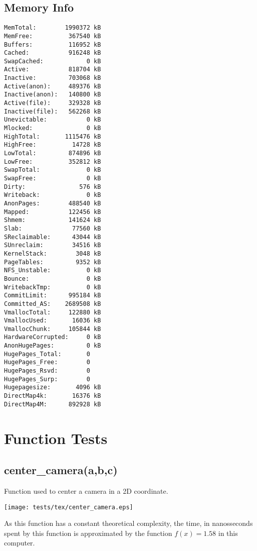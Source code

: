 \documentclass{article}
\begin{document}
\subsection{Memory Info}
\begin{verbatim}
MemTotal:        1990372 kB
MemFree:          367540 kB
Buffers:          116952 kB
Cached:           916248 kB
SwapCached:            0 kB
Active:           818704 kB
Inactive:         703068 kB
Active(anon):     489376 kB
Inactive(anon):   140800 kB
Active(file):     329328 kB
Inactive(file):   562268 kB
Unevictable:           0 kB
Mlocked:               0 kB
HighTotal:       1115476 kB
HighFree:          14728 kB
LowTotal:         874896 kB
LowFree:          352812 kB
SwapTotal:             0 kB
SwapFree:              0 kB
Dirty:               576 kB
Writeback:             0 kB
AnonPages:        488540 kB
Mapped:           122456 kB
Shmem:            141624 kB
Slab:              77560 kB
SReclaimable:      43044 kB
SUnreclaim:        34516 kB
KernelStack:        3048 kB
PageTables:         9352 kB
NFS_Unstable:          0 kB
Bounce:                0 kB
WritebackTmp:          0 kB
CommitLimit:      995184 kB
Committed_AS:    2689508 kB
VmallocTotal:     122880 kB
VmallocUsed:       16036 kB
VmallocChunk:     105844 kB
HardwareCorrupted:     0 kB
AnonHugePages:         0 kB
HugePages_Total:       0
HugePages_Free:        0
HugePages_Rsvd:        0
HugePages_Surp:        0
Hugepagesize:       4096 kB
DirectMap4k:       16376 kB
DirectMap4M:      892928 kB
\end{verbatim}
\section{Function Tests}
\subsection{center\_camera(a,b,c)}
Function used to center a camera in a 2D 
coordinate. 

\texttt{[image: tests/tex/center\_camera.eps]}

As this function has a constant
theoretical complexity, the time, in nanosseconds
spent by this function is 
approximated by the function $f(x)=1.58$
in this computer.
\end{document}
